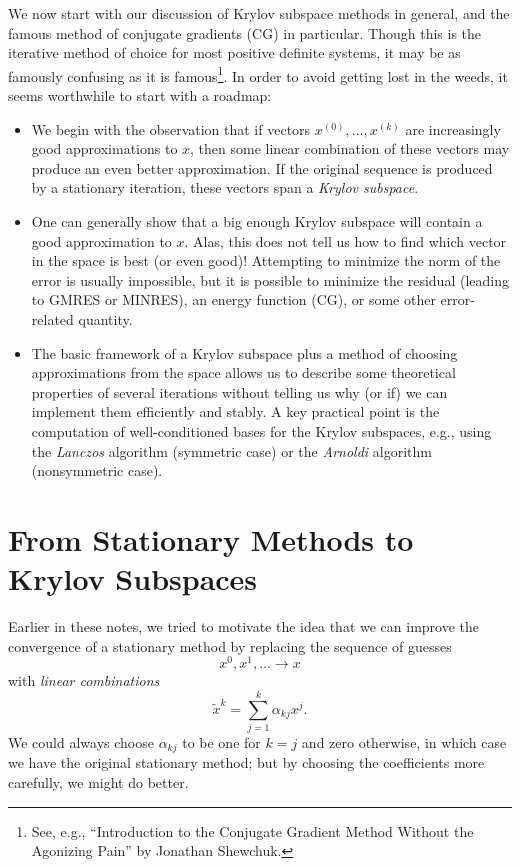\documentclass[12pt, leqno]{article}
\begin{document}
We now start with our discussion of Krylov subspace
methods in general, and the famous method of conjugate gradients (CG)
in particular.  Though this is the iterative method of choice for most
positive definite systems, it may be as famously confusing as it is
famous\footnote{%
  See, e.g., ``Introduction to the Conjugate Gradient
  Method Without the Agonizing Pain'' by Jonathan Shewchuk.}.
In order to avoid getting lost in the weeds, it seems worthwhile to
start with a roadmap:
\begin{itemize}
\item
  We begin with the observation that if vectors $x^{(0)}, \ldots,
  x^{(k)}$ are increasingly good approximations to $x$, then some
  linear combination of these vectors may produce an even better
  approximation.  If the original sequence is produced by a stationary
  iteration, these vectors span a {\em Krylov subspace}.
\item
  One can generally show that a big enough Krylov subspace will
  contain a good approximation to $x$.  Alas, this does not tell us
  how to find which vector in the space is best (or even good)!
  Attempting to minimize the norm of the error is usually impossible,
  but it is possible to minimize the residual (leading to GMRES or
  MINRES), an energy function (CG), or some other error-related
  quantity.
\item
  The basic framework of a Krylov subspace plus a method of choosing
  approximations from the space allows us to describe some theoretical
  properties of several iterations without telling us why (or if) we
  can implement them efficiently and stably.  A key practical point is
  the computation of well-conditioned bases for the Krylov subspaces,
  e.g., using the {\em Lanczos} algorithm (symmetric case) or the
  {\em Arnoldi} algorithm (nonsymmetric case).
\end{itemize}

\section*{From Stationary Methods to Krylov Subspaces}

Earlier in these notes, we tried to motivate the idea that
we can improve the convergence of a stationary method by replacing
the sequence of guesses
\[
  x^0, x^1, \ldots \rightarrow x
\]
with {\em linear combinations}
\[
  \tilde{x}^k = \sum_{j=1}^k \alpha_{kj} x^j.
\]
We could always choose $\alpha_{kj}$ to be one for $k = j$ and zero
otherwise, in which case we have the original stationary method;
but by choosing the coefficients more carefully, we might do better.
\end{document}
